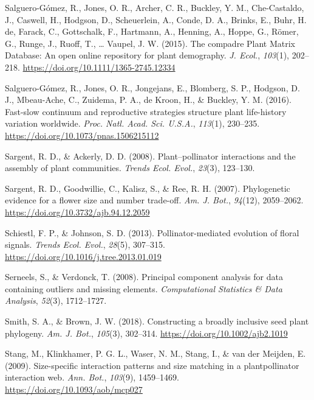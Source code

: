 \documentclass[
  12pt,
  a4paper,
]{article}
\newlength{\cslhangindent}
\newlength{\cslentryspacingunit} %
\newenvironment{CSLReferences}[2] %
 {%
  \setlength{\parindent}{0pt}
  \ifodd #1
  \let\oldpar\par
  \def\par{\hangindent=\cslhangindent\oldpar}
  \fi
  \setlength{\parskip}{#2\cslentryspacingunit}
 }%
 {}
\begin{document}
\begin{CSLReferences}{1}{0}
\leavevmode{}%
Salguero-Gómez, R., Jones, O. R., Archer, C. R., Buckley, Y. M., Che-Castaldo, J., Caswell, H., Hodgson, D., Scheuerlein, A., Conde, D. A., Brinks, E., Buhr, H. de, Farack, C., Gottschalk, F., Hartmann, A., Henning, A., Hoppe, G., Römer, G., Runge, J., Ruoff, T., \ldots{} Vaupel, J. W. (2015). The compadre {Plant Matrix Database}: An open online repository for plant demography. \emph{J. Ecol.}, \emph{103}(1), 202--218. \url{https://doi.org/10.1111/1365-2745.12334}

\leavevmode{}%
Salguero-Gómez, R., Jones, O. R., Jongejans, E., Blomberg, S. P., Hodgson, D. J., Mbeau-Ache, C., Zuidema, P. A., de Kroon, H., \& Buckley, Y. M. (2016). Fast-slow continuum and reproductive strategies structure plant life-history variation worldwide. \emph{Proc. Natl. Acad. Sci. U.S.A.}, \emph{113}(1), 230--235. \url{https://doi.org/10.1073/pnas.1506215112}

\leavevmode{}%
Sargent, R. D., \& Ackerly, D. D. (2008). Plant--pollinator interactions and the assembly of plant communities. \emph{Trends Ecol. Evol.}, \emph{23}(3), 123--130.

\leavevmode{}%
Sargent, R. D., Goodwillie, C., Kalisz, S., \& Ree, R. H. (2007). Phylogenetic evidence for a flower size and number trade-off. \emph{Am. J. Bot.}, \emph{94}(12), 2059--2062. \url{https://doi.org/10.3732/ajb.94.12.2059}

\leavevmode{}%
Schiestl, F. P., \& Johnson, S. D. (2013). Pollinator-mediated evolution of floral signals. \emph{Trends Ecol. Evol.}, \emph{28}(5), 307--315. \url{https://doi.org/10.1016/j.tree.2013.01.019}

\leavevmode{}%
Serneels, S., \& Verdonck, T. (2008). Principal component analysis for data containing outliers and missing elements. \emph{Computational Statistics \& Data Analysis}, \emph{52}(3), 1712--1727.

\leavevmode{}%
Smith, S. A., \& Brown, J. W. (2018). Constructing a broadly inclusive seed plant phylogeny. \emph{Am. J. Bot.}, \emph{105}(3), 302--314. \url{https://doi.org/10.1002/ajb2.1019}

\leavevmode{}%
Stang, M., Klinkhamer, P. G. L., Waser, N. M., Stang, I., \& van der Meijden, E. (2009). Size-specific interaction patterns and size matching in a plant\textendash pollinator interaction web. \emph{Ann. Bot.}, \emph{103}(9), 1459--1469. \url{https://doi.org/10.1093/aob/mcp027}


\end{CSLReferences}
\end{document}
